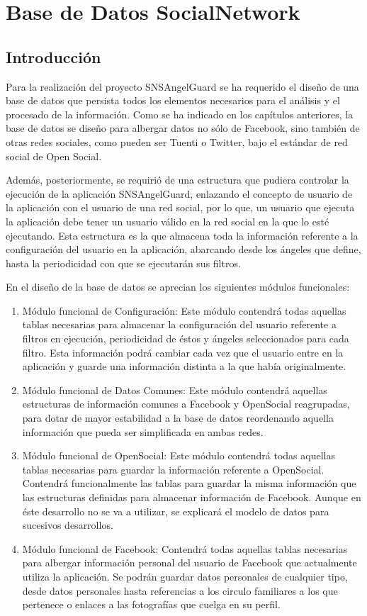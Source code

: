 
\chapter{Base de Datos SocialNetwork} 

\section{Introducción}
Para la realización del proyecto SNSAngelGuard se ha requerido el diseño de una base de datos que persista todos los elementos necesarios para el análisis y el procesado de la información. Como se ha indicado en los capítulos anteriores, la base de datos se diseño para albergar datos no sólo de Facebook, sino también de otras redes sociales, como pueden ser Tuenti o Twitter, bajo el estándar de red social de Open Social.
\bigskip
\par
Además, posteriormente, se requirió de una estructura que pudiera controlar la ejecución de la aplicación SNSAngelGuard, enlazando el concepto de usuario de la aplicación con el usuario de una red social, por lo que, un usuario que ejecuta la aplicación debe tener un usuario válido en la red social en la que lo esté ejecutando. Esta estructura es la que almacena toda la información referente a la configuración del usuario en la aplicación, abarcando desde los ángeles que define, hasta la periodicidad con que se ejecutarán sus filtros.
\bigskip
\par
En el diseño de la base de datos se aprecian los siguientes módulos funcionales:
\begin{enumerate}
\item Módulo funcional de Configuración: Este módulo contendrá todas aquellas tablas necesarias para almacenar la configuración del usuario referente a filtros en ejecución, periodicidad de éstos y ángeles seleccionados para cada filtro. Esta información podrá cambiar cada vez que el usuario entre en la aplicación y guarde una información distinta a la que había originalmente.
\item Módulo funcional de Datos Comunes: Este módulo contendrá aquellas estructuras de información comunes a Facebook y OpenSocial reagrupadas, para dotar de mayor estabilidad a la base de datos reordenando aquella información que pueda ser simplificada en ambas redes.
\item Módulo funcional de OpenSocial: Este módulo contendrá todas aquellas tablas necesarias para guardar la información referente a OpenSocial. Contendrá funcionalmente las tablas para guardar la misma información que las estructuras definidas para almacenar información de Facebook. Aunque en éste desarrollo no se va a utilizar, se explicará el modelo de datos para sucesivos desarrollos. 
\item Módulo funcional de Facebook: Contendrá todas aquellas tablas necesarias para albergar información personal del usuario de Facebook que actualmente utiliza la aplicación. Se podrán guardar datos personales de cualquier tipo, desde datos personales hasta referencias a los circulo familiares a los que pertenece o enlaces a las fotografías que cuelga en su perfil.
\end{enumerate}
